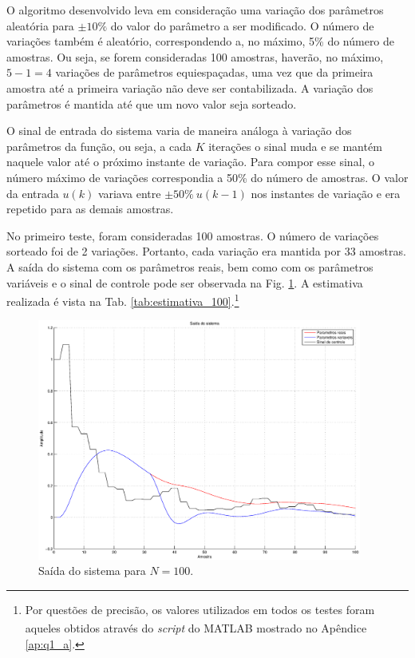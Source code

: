 O algoritmo desenvolvido leva em consideração uma variação dos parâmetros
aleatória para $\pm 10\%$ do valor do parâmetro a ser modificado. O número de
variações também é aleatório, correspondendo a, no máximo, 5\% do número de
amostras. Ou seja, se forem consideradas 100 amostras, haverão, no máximo, $5-1
= 4$ variações de parâmetros equiespaçadas, uma vez que da primeira amostra até
a primeira variação não deve ser contabilizada. A variação dos parâmetros é
mantida até que um novo valor seja sorteado.

O sinal de entrada do sistema varia de maneira análoga à variação dos parâmetros
da função, ou seja, a cada $K$ iterações o sinal muda e se mantém naquele valor
até o próximo instante de variação. Para compor esse sinal, o número máximo de
variações correspondia a 50\% do número de amostras. O valor da entrada $u(k)$
variava entre $\pm 50\%\ u(k-1)$ nos instantes de variação e era repetido para as
demais amostras.

No primeiro teste, foram consideradas 100 amostras. O número de variações
sorteado foi de 2 variações. Portanto, cada variação era mantida por 33
amostras. A saída do sistema com os parâmetros reais, bem como com os parâmetros
variáveis e o sinal de controle pode ser observada na Fig.
\ref{fig:saida_sist_100}. A estimativa realizada é vista na Tab.
\ref{tab:estimativa_100}.\footnote{Por questões de precisão, os valores
utilizados em todos os testes foram aqueles obtidos através do {\it script} do
MATLAB\textsuperscript{\textregistered} mostrado no Apêndice \ref{ap:q1_a}.}

\begin{figure}[htb]
\centering
    \includegraphics[width=0.95\textwidth]{imgs/questao2/saida_100}
    \caption{Saída do sistema para $N = 100$.}
    \label{fig:saida_sist_100}
\end{figure}

